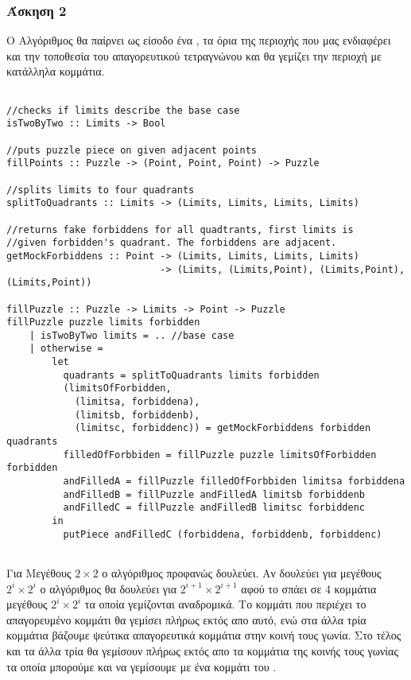 \newpage
\subsubsection*{Άσκηση 2}

Ο Αλγόριθμος θα παίρνει ως είσοδο ένα , τα όρια της περιοχής που μας ενδιαφέρει και την
τοποθεσία του απαγορευτικού τετραγνώνου και θα γεμίζει την περιοχή με κατάλληλα κομμάτια.

\begin{verbatim}

//checks if limits describe the base case
isTwoByTwo :: Limits -> Bool

//puts puzzle piece on given adjacent points
fillPoints :: Puzzle -> (Point, Point, Point) -> Puzzle

//splits limits to four quadrants
splitToQuadrants :: Limits -> (Limits, Limits, Limits, Limits)

//returns fake forbiddens for all quadtrants, first limits is 
//given forbidden's quadrant. The forbiddens are adjacent.
getMockForbiddens :: Point -> (Limits, Limits, Limits, Limits) 
                           -> (Limits, (Limits,Point), (Limits,Point), (Limits,Point))

fillPuzzle :: Puzzle -> Limits -> Point -> Puzzle
fillPuzzle puzzle limits forbidden 
    | isTwoByTwo limits = .. //base case
    | otherwise = 
        let
          quadrants = splitToQuadrants limits forbidden
          (limitsOfForbidden,
            (limitsa, forbiddena), 
            (limitsb, forbiddenb), 
            (limitsc, forbiddenc)) = getMockForbiddens forbidden quadrants
          filledOfForbbiden = fillPuzzle puzzle limitsOfForbidden forbidden
          andFilledA = fillPuzzle filledOfForbbiden limitsa forbiddena
          andFilledB = fillPuzzle andFilledA limitsb forbiddenb
          andFilledC = fillPuzzle andFilledB limitsc forbiddenc
        in
          putPiece andFilledC (forbiddena, forbiddenb, forbiddenc)
    
\end{verbatim}

Για  Μεγέθους $2\times2$ ο αλγόριθμος προφανώς δουλεύει.
Αν δουλεύει για μεγέθους $2^i\times2^i$ ο αλγόριθμος θα δουλεύει για $2^{i+1}\times2^{i+1}$ αφού
το  σπάει σε 4 κομμάτια μεγέθους $2^i\times2^i$ τα οποία γεμίζονται αναδρομικά.
Το κομμάτι που περιέχει το απαγορευμένο κομμάτι θα γεμίσει πλήρως εκτός απο αυτό,
ενώ στα άλλα τρία κομμάτια βάζουμε ψεύτικα απαγορευτικά κομμάτια στην κοινή τους γωνία.
Στο τέλος και τα άλλα τρία θα γεμίσουν πλήρως εκτός απο τα κομμάτια της κοινής τους γωνίας
τα οποία μπορούμε και να γεμίσουμε με ένα κομμάτι του . 
